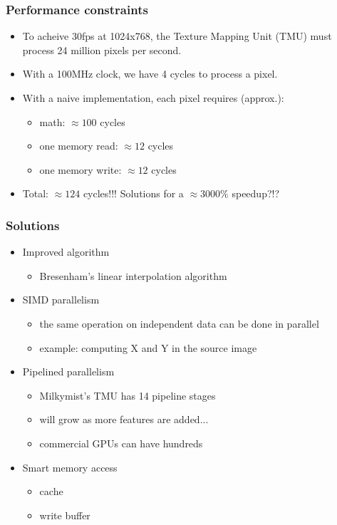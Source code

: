 \documentclass{beamer}
\begin{document}
\frame
{
  \frametitle{Performance constraints}
  
  \begin{itemize}
  \item To acheive 30fps at 1024x768, the Texture Mapping Unit (TMU) must process 24 million pixels per second.
  \item With a 100MHz clock, we have 4 cycles to process a pixel.
  \item With a naive implementation, each pixel requires (approx.):
  \begin{itemize}
  \item math: $\approx100$ cycles
  \item one memory read: $\approx12$ cycles
  \item one memory write: $\approx12$ cycles
  \end{itemize}
  \item Total: $\approx124$ cycles!!! Solutions for a $\approx3000\%$ speedup?!?
  \end{itemize}
}

\frame
{
  \frametitle{Solutions}
  
  \begin{itemize}
  \item Improved algorithm
  \begin{itemize}
  \item Bresenham's linear interpolation algorithm
  \end{itemize}
  \item SIMD parallelism
  \begin{itemize}
  \item the same operation on independent data can be done in parallel
  \item example: computing X and Y in the source image
  \end{itemize}
  \item Pipelined parallelism
  \begin{itemize}
  \item Milkymist's TMU has 14 pipeline stages
  \item will grow as more features are added...
  \item commercial GPUs can have hundreds
  \end{itemize}
  \item Smart memory access
  \begin{itemize}
  \item cache
  \item write buffer
  \end{itemize}
  \end{itemize}
}
\end{document}
